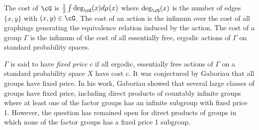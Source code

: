 \documentclass[12pt]{article}
\theoremstyle{plain}
\newtheorem{thm}{Theorem}[section]
\theoremstyle{definition}
\theoremstyle{remark}
\newcommand{\G}{\Gamma}
\newcommand\Pois{\operatorname{Pois}}
\def\cc{{\curvearrowright}}
\begin{document}
The cost of $\cG$ is $\frac{1}{2}\int \deg_\cG(x)d\mu(x)$ where $\deg_\cG(x)$ is the number of edges $\{x,y\}$ with $(x,y)\in \cG$. The cost of an action is the infimum over the cost of all graphings generating the equivalence relation induced by the action. The cost of a group $\Gamma$ is the infimum of the cost of all essentially free, ergodic actions of $\G$ on standard probability spaces.


$\Gamma$ is said to have \textit{fixed price $c$} if all ergodic, essentially free actions of $\Gamma$ on a standard probability space $X$ have cost $c$. It was conjectured by Gaboriau \cite{gaboriau-cost} that all groups have fixed price. In his work, Gaboriau showed that several large classes of groups have fixed price, including direct products of countably infinite groups where at least one of the factor groups has an infinite subgroup with fixed price 1. However, the question has remained open for direct products of groups in which none of the factor groups has a fixed price 1 subgroup.



\end{document}
